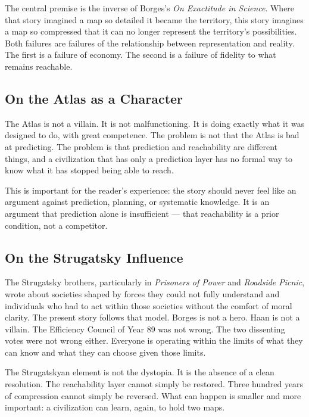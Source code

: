 \documentclass[11pt, letterpaper]{article}
\begin{document}
The central premise is the inverse of Borges's \textit{On Exactitude in
Science}. Where that story imagined a map so detailed it became the territory,
this story imagines a map so compressed that it can no longer represent the
territory's possibilities. Both failures are failures of the relationship
between representation and reality. The first is a failure of economy. The
second is a failure of fidelity to what remains reachable.

\subsection*{On the Atlas as a Character}

The Atlas is not a villain. It is not malfunctioning. It is doing exactly
what it was designed to do, with great competence. The problem is not that
the Atlas is bad at predicting. The problem is that prediction and reachability
are different things, and a civilization that has only a prediction layer has
no formal way to know what it has stopped being able to reach.

This is important for the reader's experience: the story should never feel
like an argument against prediction, planning, or systematic knowledge. It
is an argument that prediction alone is insufficient --- that reachability
is a prior condition, not a competitor.

\subsection*{On the Strugatsky Influence}

The Strugatsky brothers, particularly in \textit{Prisoners of Power} and
\textit{Roadside Picnic}, wrote about societies shaped by forces they could not
fully understand and individuals who had to act within those societies without
the comfort of moral clarity. The present story follows that model. Borges is
not a hero. Haan is not a villain. The Efficiency Council of Year 89 was not
wrong. The two dissenting votes were not wrong either. Everyone is operating
within the limits of what they can know and what they can choose given those
limits.

The Strugatskyan element is not the dystopia. It is the absence of a clean
resolution. The reachability layer cannot simply be restored. Three hundred
years of compression cannot simply be reversed. What can happen is smaller
and more important: a civilization can learn, again, to hold two maps.
\end{document}
